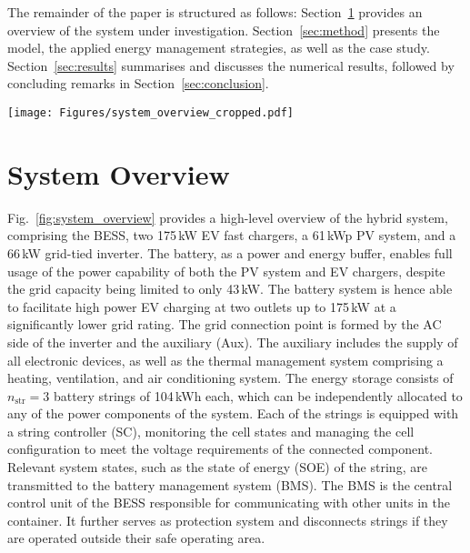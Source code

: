 \documentclass[final,5p,times,twocolumn]{elsarticle}
\begin{document}
The remainder of the paper is structured as follows: Section~\ref{sec:system} provides an overview of the system under investigation. Section~\ref{sec:method} presents the model, the applied energy management strategies, as well as the case study. Section~\ref{sec:results} summarises and discusses the numerical results, followed by concluding remarks in Section~\ref{sec:conclusion}.
 
 \begin{figure*}[htp]
    \centering
    \texttt{[image: Figures/system\_overview\_cropped.pdf]}
    \caption{Overview of the hybrid system comprising a multi-battery storage system, a grid-tie inverter, a PV installation, and two EV fast chargers.}
    \label{fig:system_overview}
\end{figure*}

\section{System Overview}\label{sec:system}

Fig.~\ref{fig:system_overview} provides a high-level overview of the hybrid system, comprising the BESS, two 175\,kW EV fast chargers, a 61\,kWp PV system, and a 66\,kW grid-tied inverter. The battery, as a power and energy buffer, enables full usage of the power capability of both the PV system and EV chargers, despite the grid capacity being limited to only 43\,kW. The battery system is hence able to facilitate high power EV charging at two outlets up to 175\,kW at a significantly lower grid rating. The grid connection point is formed by the AC side of the inverter and the auxiliary (Aux). The auxiliary includes the supply of all electronic devices, as well as the thermal management system comprising a heating, ventilation, and air conditioning system. The energy storage consists of $n_{\text{str}} = 3$ battery strings of 104\,kWh each, which can be independently allocated to any of the power components of the system. Each of the strings is equipped with a string controller (SC), monitoring the cell states and managing the cell configuration to meet the voltage requirements of the connected component. Relevant system states, such as the state of energy (SOE) of the string, are transmitted to the battery management system (BMS). The BMS is the central control unit of the BESS responsible for communicating with other units in the container. It further serves as protection system and disconnects strings if they are operated outside their safe operating area. 
 
\end{document}
